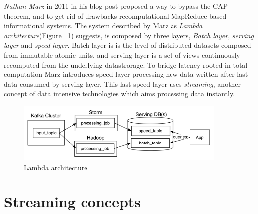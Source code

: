 \textit{Nathan Marz} in 2011 in his blog post\cite{beatCAP} proposed a way to bypass the CAP theorem, and to get rid of drawbacks recomputational MapReduce based informational systems. %
 The system described by Marz as \textit{Lambda architecture}(Figure ~\ref{fig:lambda}) suggests, is composed by three layers, \textit{Batch layer}, \textit{serving layer} and \textit{speed layer}. Batch layer is is the level of distributed datasets composed from immutable 
atomic units, and serving layer is a set of views continuously recomputed from the underlying datastrorage. To bridge latency rooted in total computation Marz introduces speed layer processing new data written after last data consumed by serving layer.
This last speed layer uses \textit{streaming}, another concept of data intensive technologies which aims processing data instantly.

\begin{figure}[!ht]
  \centering    
      \includegraphics[width=0.9\textwidth]{figures/lambda-architecture.png}
  \caption{Lambda architecture \cite{beatCAP}}
  \label{fig:lambda}
\end{figure}
 
\section{Streaming concepts } \label{streaming}

